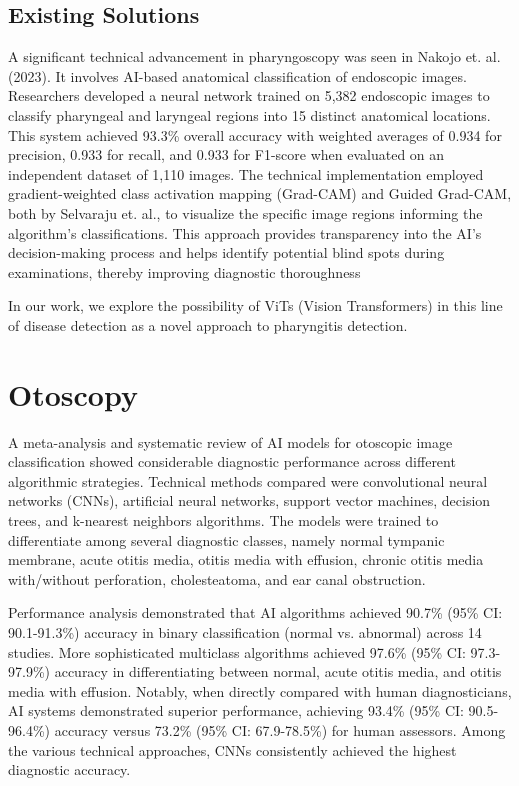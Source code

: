 \subsection{Existing Solutions}

A significant technical advancement in pharyngoscopy was seen in Nakojo et. al. (2023). It involves AI-based anatomical classification of endoscopic images. Researchers developed a neural network trained on 5,382 endoscopic images to classify pharyngeal and laryngeal regions into 15 distinct anatomical locations. This system achieved 93.3\% overall accuracy with weighted averages of 0.934 for precision, 0.933 for recall, and 0.933 for F1-score when evaluated on an independent dataset of 1,110 images. The technical implementation employed gradient-weighted class activation mapping (Grad-CAM) \cite{selva} and Guided Grad-CAM, both by Selvaraju et. al., to visualize the specific image regions informing the algorithm's classifications. This approach provides transparency into the AI's decision-making process and helps identify potential blind spots during examinations, thereby improving diagnostic thoroughness~\cite{nakajo} \par

In our work, we explore the possibility of ViTs (Vision Transformers) in this line of disease detection as a novel approach to pharyngitis detection.

\section{Otoscopy}

A meta-analysis and systematic review of AI models for otoscopic image classification showed considerable diagnostic performance across different algorithmic strategies. Technical methods compared were convolutional neural networks (CNNs), artificial neural networks, support vector machines, decision trees, and k-nearest neighbors algorithms. The models were trained to differentiate among several diagnostic classes, namely normal tympanic membrane, acute otitis media, otitis media with effusion, chronic otitis media with/without perforation, cholesteatoma, and ear canal obstruction.~\cite{habibi}

Performance analysis demonstrated that AI algorithms achieved 90.7\% (95\% CI: 90.1-91.3\%) accuracy in binary classification (normal vs. abnormal) across 14 studies. More sophisticated multiclass algorithms achieved 97.6\% (95\% CI: 97.3-97.9\%) accuracy in differentiating between normal, acute otitis media, and otitis media with effusion. Notably, when directly compared with human diagnosticians, AI systems demonstrated superior performance, achieving 93.4\% (95\% CI: 90.5-96.4\%) accuracy versus 73.2\% (95\% CI: 67.9-78.5\%) for human assessors. Among the various technical approaches, CNNs consistently achieved the highest diagnostic accuracy. \cite{habibi}